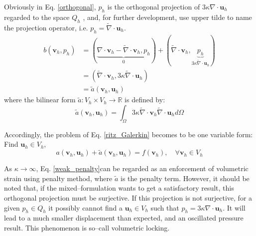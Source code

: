 Obviously in Eq. \eqref{orthogonal},
$p_h$ is the orthogonal projection of $3\kappa \nabla \cdot \boldsymbol u_h$ regarded to the space $Q_h$ \cite{brezzi1991a},
and, for further development, use upper tilde to name the projection operator, i.e. $p_h = \tilde \nabla \cdot \boldsymbol u_h$.
\begin{equation}
    \begin{split}
        b(\boldsymbol v_h, p_h) &= (
            \underbrace{
            \nabla \cdot \boldsymbol v_h - \tilde \nabla \cdot \boldsymbol v_h, p_h
            }_{0}
        ) + (\tilde \nabla \cdot \boldsymbol v_h, \underbrace{p_h}_{3\kappa\tilde \nabla \cdot \boldsymbol u_h}) \\
        &= 
        (\tilde \nabla \cdot \boldsymbol v_h, 3\kappa\tilde \nabla \cdot \boldsymbol u_h) \\
        &= \tilde a(\boldsymbol v_h, \boldsymbol u_h)
    \end{split}
\end{equation}
where the bilinear form $\tilde a: V_h \times V_h \rightarrow \mathbb R$ is defined by:
\begin{equation}
    \tilde a(\boldsymbol v_h, \boldsymbol u_h) =
    \int_\Omega 3\kappa \tilde \nabla \cdot \boldsymbol v_h \tilde \nabla \cdot \boldsymbol u_h d\Omega
\end{equation}

Accordingly, the problem of Eq. \eqref{ritz_Galerkin} becomes to be one variable form:
Find $\boldsymbol u_h \in V_h$,
\begin{equation}\label{weak_penalty}
    a(\boldsymbol v_h, \boldsymbol u_h) + \tilde a(\boldsymbol v_h, \boldsymbol u_h) = f(\boldsymbol v_h)
    , \quad \forall \boldsymbol v_h \in V_h
\end{equation}

As $\kappa \rightarrow \infty$, Eq. \eqref{weak_penalty}can be regarded as an enforcement of volumetric strain using penalty method, 
where $\tilde a$ is the penalty term.
However, it should be noted that, if the mixed--formulation wants to get a satisfactory result, this orthogonal projection must be surjective\cite{stein2004}.
If this projection is not surjective,
for a given $p_h\in Q_h$ it possibly cannot find a $\boldsymbol u_h \in V_h$ such that $p_h = 3\kappa \nabla \cdot \boldsymbol u_h$. 
It will lead to a much smaller displacement than expected, and an oscillated pressure result. 
This phenomenon is so--call volumetric locking.


